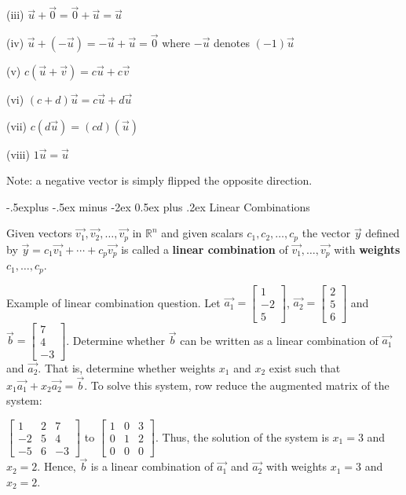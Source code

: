\documentclass[10pt,landscape]{article}
\makeatletter
\renewcommand{\subsection}{\@startsection{subsection}{2}{0mm}%
                                {-.5explus -.5ex minus -2ex}%
                                {0.5ex plus .2ex}%
                                {\normalfont\footnotesize\bfseries}}
\makeatother
\begin{document}
\begin{multicols}{4}
(iii) $\vec{u} + \vec{0} = \vec{0} + \vec{u} = \vec{u}$

(iv) $\vec{u} + (-\vec{u}) = -\vec{u} + \vec{u} = \vec{0}$ where $-\vec{u}$ denotes $(-1)\vec{u}$

(v) $c(\vec{u}+\vec{v}) = c\vec{u} + c\vec{v}$

(vi) $(c +d)\vec{u} = c\vec{u} + d\vec{u}$

(vii) $c(d\vec{u}) = (cd)(\vec{u})$

(viii) $1\vec{u} = \vec{u}$

Note: a negative vector is simply flipped the opposite direction.

\subsection{Linear Combinations}

Given vectors $\vec{v_1}, \vec{v_2},\dots,\vec{v_p}$ in $\mathbb{R}^n$ and given scalars $c_1, c_2,\dots,c_p$ the vector $\vec{y}$ defined by $\vec{y}=c_1\vec{v_1}+\cdots+c_p\vec{v_p}$ is called a \textbf{linear combination} of $\vec{v_1},\dots,\vec{v_p}$ with \textbf{weights} $c_1,\dots,c_p$.

\medskip

Example of linear combination question. Let $\vec{a_1} = \left[ \begin{array}{r} 1 \\ -2 \\5 \end{array} \right]$, $\vec{a_2} = \left[ \begin{array}{r} 2 \\ 5 \\6 \end{array} \right]$ and $\vec{b} = \left[ \begin{array}{r} 7 \\ 4 \\-3 \end{array} \right]$. Determine whether $\vec{b}$ can be written as a linear combination of $\vec{a_1}$ and $\vec{a_2}$. That is, determine whether weights $x_1$ and $x_2$ exist such that $x_1\vec{a_1} + x_2\vec{a_2} = \vec{b}$.  To solve this system, row reduce the augmented matrix of the system: 

$\left[
\begin{array}{rrr}
1 & 2 & 7 \\ -2 & 5 & 4 \\ -5 & 6 & -3
\end{array}
\right]$ to 
$\left[
\begin{array}{rrr}
1 & 0 & 3 \\ 0 & 1 & 2 \\ 0 & 0 & 0
\end{array}
\right]$. Thus, the solution of the system is $x_1 = 3$ and $x_2 = 2$. Hence, $\vec{b}$ is a linear combination of $\vec{a_1}$ and $\vec{a_2}$ with weights $x_1 = 3$ and $x_2 = 2$.  


\end{multicols}
\end{document}
